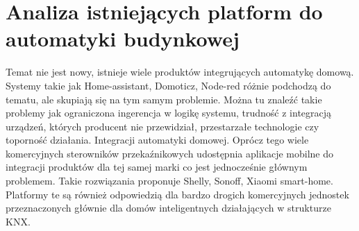 \chapter{Analiza istniejących platform do automatyki budynkowej}
Temat nie jest nowy, istnieje wiele produktów integrujących automatykę domową. Systemy takie jak Home-assistant, Domoticz, Node-red różnie podchodzą do tematu, ale skupiają się na tym samym problemie. Można tu znaleźć takie problemy jak ograniczona ingerencja w logikę systemu, trudność z integracją urządzeń, których producent nie przewidział, przestarzałe technologie czy toporność działania. Integracji automatyki domowej. Oprócz tego wiele komercyjnych sterowników przekaźnikowych udostępnia aplikacje mobilne do integracji produktów dla tej samej marki co jest jednocześnie głównym problemem. Takie rozwiązania proponuje Shelly, Sonoff, Xiaomi smart-home. Platformy te są również odpowiedzią dla bardzo drogich komercyjnych jednostek przeznaczonych  głównie dla domów inteligentnych działających w strukturze KNX.